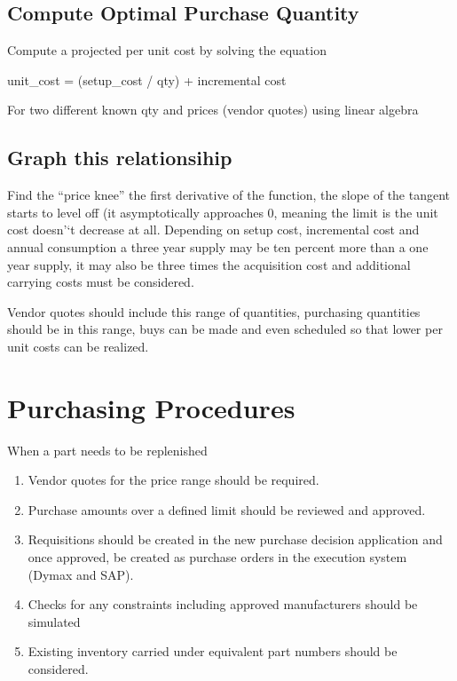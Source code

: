 \documentclass[letterpaper,10pt,english]{sphinxmanual}
\begin{document}
\subsection{Compute Optimal Purchase Quantity}
\label{BusinessProcessReengineering:compute-optimal-purchase-quantity}
Compute a projected per unit cost by solving the equation

unit\_cost = (setup\_cost / qty) + incremental cost

For two different known qty and prices (vendor quotes) using linear
algebra


\subsection{Graph this relationsihip}
\label{BusinessProcessReengineering:graph-this-relationsihip}
Find the ``price knee'' the first derivative of the function, the slope of
the tangent starts to level off (it asymptotically approaches 0, meaning
the limit is the unit cost doesn'`t decrease at all. Depending on setup
cost, incremental cost and annual consumption a three year supply may be
ten percent more than a one year supply, it may also be three times the
acquisition cost and additional carrying costs must be considered.

Vendor quotes should include this range of quantities, purchasing
quantities should be in this range, buys can be made and even scheduled
so that lower per unit costs can be realized.


\section{Purchasing Procedures}
\label{BusinessProcessReengineering:purchasing-procedures}
When a part needs to be replenished
\begin{enumerate}
\item {} 
Vendor quotes for the price range should be required.

\item {} 
Purchase amounts over a defined limit should be reviewed and
approved.

\item {} 
Requisitions should be created in the new purchase decision
application and once approved, be created as purchase orders in the
execution system (Dymax and SAP).

\item {} 
Checks for any constraints including approved manufacturers should be
simulated

\item {} 
Existing inventory carried under equivalent part numbers should be
considered.

\end{enumerate}
\end{document}

